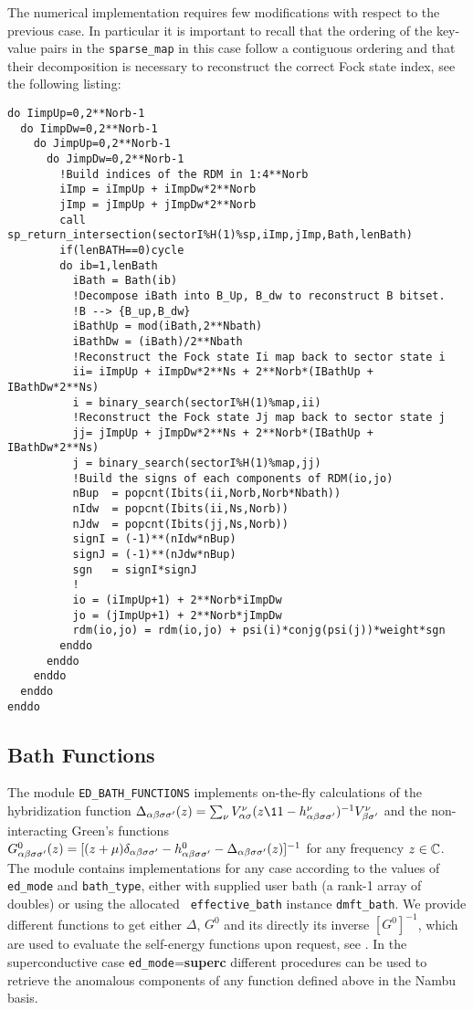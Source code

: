 \documentclass[edipack2.tex]{subfiles}
\begin{document}
The numerical implementation requires few modifications with respect
to the previous case. In particular it is important to recall that the
ordering of the key-value pairs in the {\tt sparse\_map} in this case
follow a contiguous ordering and that their decomposition is necessary
to reconstruct the correct Fock state index, see the following
listing:
\begin{lstlisting}[style=fstyle,numbers=none,basicstyle={\scriptsize\ttfamily}]
do IimpUp=0,2**Norb-1
  do IimpDw=0,2**Norb-1
    do JimpUp=0,2**Norb-1
      do JimpDw=0,2**Norb-1
        !Build indices of the RDM in 1:4**Norb
        iImp = iImpUp + iImpDw*2**Norb
        jImp = jImpUp + jImpDw*2**Norb
        call sp_return_intersection(sectorI%H(1)%sp,iImp,jImp,Bath,lenBath)
        if(lenBATH==0)cycle
        do ib=1,lenBath
          iBath = Bath(ib)
          !Decompose iBath into B_Up, B_dw to reconstruct B bitset. 
          !B --> {B_up,B_dw}
          iBathUp = mod(iBath,2**Nbath)
          iBathDw = (iBath)/2**Nbath
          !Reconstruct the Fock state Ii map back to sector state i
          ii= iImpUp + iImpDw*2**Ns + 2**Norb*(IBathUp + IBathDw*2**Ns)
          i = binary_search(sectorI%H(1)%map,ii)
          !Reconstruct the Fock state Jj map back to sector state j
          jj= jImpUp + jImpDw*2**Ns + 2**Norb*(IBathUp + IBathDw*2**Ns)
          j = binary_search(sectorI%H(1)%map,jj)
          !Build the signs of each components of RDM(io,jo)
          nBup  = popcnt(Ibits(ii,Norb,Norb*Nbath))
          nIdw  = popcnt(Ibits(ii,Ns,Norb))
          nJdw  = popcnt(Ibits(jj,Ns,Norb))
          signI = (-1)**(nIdw*nBup)
          signJ = (-1)**(nJdw*nBup)
          sgn   = signI*signJ
          !  
          io = (iImpUp+1) + 2**Norb*iImpDw
          jo = (jImpUp+1) + 2**Norb*jImpDw
          rdm(io,jo) = rdm(io,jo) + psi(i)*conjg(psi(j))*weight*sgn
        enddo
      enddo
    enddo
  enddo
enddo
\end{lstlisting}



\subsection{Bath Functions}\label{sSecFunc}
The module {\tt ED\_BATH\_FUNCTIONS} implements on-the-fly
calculations of the hybridization function $\Delta_{\a\b\s\s'}(z)=\sum_\nu
{V^\nu_{\a\s}}(z\11-h^\nu_{\a\b\s\s'})^{-1}V^\nu_{\b\s'}$ and the
non-interacting Green's functions $G^0_{\alpha\beta\sigma\sigma'}(z) =
[(z + \mu)\delta_{\alpha\beta\sigma\sigma'} - h^0_{\alpha\beta\sigma\sigma'} -
\Delta_{\alpha\beta\sigma\sigma'}(z)]^{-1}$ for any frequency $z\in\mathbb{C}$. 
The module contains implementations for any case according to the
values of {\tt ed\_mode} and {\tt bath\_type}, either with supplied
user bath (a rank-1 array of doubles) or using the allocated {\tt
  effective\_bath} instance {\tt dmft\_bath}. 
We provide different functions to get either $\Delta$, $G^0$ and its
directly its inverse $[G^0]^{-1}$, which are used to evaluate the
self-energy functions upon request, see .
In the superconductive case {\tt ed\_mode}={\bf superc} different
procedures can be used to retrieve the anomalous components of any
function defined above in the Nambu basis. 
\end{document}
